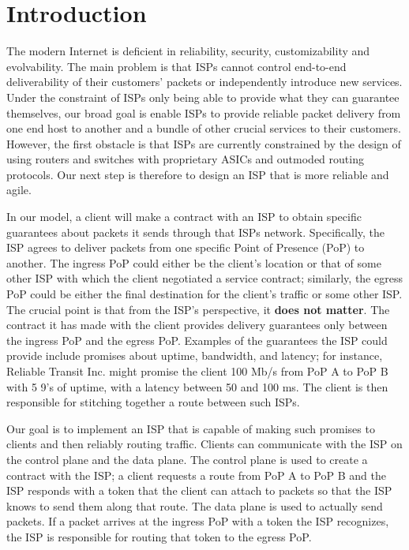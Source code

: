 \documentclass{article}
\begin{document}
\section{Introduction}

The modern Internet is deficient in reliability, security,
customizability and evolvability. The main problem is that ISPs cannot
control end-to-end deliverability of their customers' packets or
independently introduce new services. Under the constraint of ISPs
only being able to provide what they can guarantee themselves, our
broad goal is enable ISPs to provide reliable packet delivery from one
end host to another and a bundle of other crucial services to their
customers. However, the first obstacle is that ISPs are currently
constrained by the design of using routers and switches with
proprietary ASICs and outmoded routing protocols. Our next step is
therefore to design an ISP that is more reliable and agile.

In our model, a client will make a contract with an ISP to obtain
specific guarantees about packets it sends through that ISPs
network. Specifically, the ISP agrees to deliver packets from one
specific Point of Presence (PoP) to another. The ingress PoP could
either be the client's location or that of some other ISP with which
the client negotiated a service contract; similarly, the egress PoP
could be either the final destination for the client's traffic or some
other ISP. The crucial point is that from the ISP's perspective, it
\textbf{does not matter}. The contract it has made with the client
provides delivery guarantees only between the ingress PoP and the
egress PoP. Examples of the guarantees the ISP could provide include
promises about uptime, bandwidth, and latency; for instance, Reliable
Transit Inc. might promise the client 100 Mb/s from PoP A to PoP B
with 5 9's of uptime, with a latency between 50 and 100 ms. The client
is then responsible for stitching together a route between such ISPs.

Our goal is to implement an ISP that is capable of making such
promises to clients and then reliably routing traffic. Clients can
communicate with the ISP on the control plane and the data plane. The
control plane is used to create a contract with the ISP; a client
requests a route from PoP A to PoP B and the ISP responds with a token
that the client can attach to packets so that the ISP knows to send
them along that route. The data plane is used to actually send
packets. If a packet arrives at the ingress PoP with a token the ISP
recognizes, the ISP is responsible for routing that token to the
egress PoP.
\end{document}

